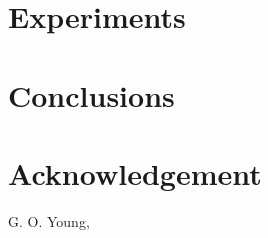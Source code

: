\documentclass[letterpaper, 10 pt, conference]{ieeeconf}  %
\begin{document}
\section{Experiments}




\section{Conclusions}

\section{Acknowledgement}


\addtolength{\textheight}{-12cm}   %





\begin{thebibliography}{99}

 G. O. Young,


\end{thebibliography}
\end{document}
